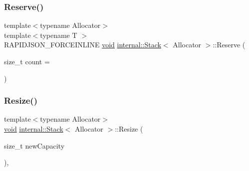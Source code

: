\mbox{\label{classinternal_1_1Stack_a7ae5de892834b7fc16099eb5e23dd97c}} 
\subsubsection{\texorpdfstring{Reserve()}{Reserve()}}
{\footnotesize\ttfamily template$<$typename Allocator$>$ \\
template$<$typename T $>$ \\
R\+A\+P\+I\+D\+J\+S\+O\+N\+\_\+\+F\+O\+R\+C\+E\+I\+N\+L\+I\+NE \hyperlink{imgui__impl__opengl3__loader_8h_ac668e7cffd9e2e9cfee428b9b2f34fa7}{void} \hyperlink{classinternal_1_1Stack}{internal\+::\+Stack}$<$ Allocator $>$\+::Reserve (\begin{DoxyParamCaption}\item[{size\+\_\+t}]{count = {} }\end{DoxyParamCaption})\hspace{0.3cm}{\ttfamily [inline]}}

\mbox{\label{classinternal_1_1Stack_a0a23948aa17a9870a5e228d465e40e92}} 
\subsubsection{\texorpdfstring{Resize()}{Resize()}}
{\footnotesize\ttfamily template$<$typename Allocator$>$ \\
\hyperlink{imgui__impl__opengl3__loader_8h_ac668e7cffd9e2e9cfee428b9b2f34fa7}{void} \hyperlink{classinternal_1_1Stack}{internal\+::\+Stack}$<$ Allocator $>$\+::Resize (\begin{DoxyParamCaption}\item[{size\+\_\+t}]{new\+Capacity }\end{DoxyParamCaption})\hspace{0.3cm}{\ttfamily [inline]}, {\ttfamily [private]}}

\mbox{\label{classinternal_1_1Stack_a3852b8494d69c91f6a238a51572e591e}} 
